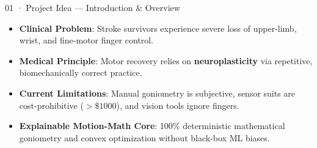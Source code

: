 \documentclass[aspectratio=169,11pt]{beamer}
\begin{document}
\begin{frame}{01 · Project Idea — Introduction \& Overview}
\vspace{-1mm}
\begin{itemize}
    \setlength{\itemsep}{2.5pt}
    \item \textbf{Clinical Problem}: Stroke survivors experience severe loss of upper-limb, wrist, and fine-motor finger control.
    \item \textbf{Medical Principle}: Motor recovery relies on \textbf{neuroplasticity} via repetitive, biomechanically correct practice.
    \item \textbf{Current Limitations}: Manual goniometry is subjective, sensor suits are cost-prohibitive ($>\$1000$), and vision tools ignore fingers.
\end{itemize}

\vspace{1.5mm}

\vspace{1.5mm}
\begin{itemize}
    \item \textbf{Explainable Motion-Math Core}: 100\% deterministic mathematical goniometry and convex optimization without black-box ML biases.
\end{itemize}
\end{frame}
\end{document}
